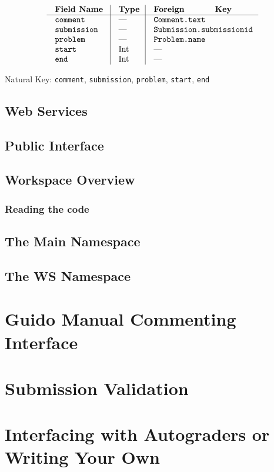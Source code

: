 $$\vbox{
  \offinterlineskip
  \halign{
    \strut \quad {\tt #}  & \vrule\quad #  & \vrule\quad # \cr
    {\bf Field Name}  & {\bf Type}  & {\bf Foreign Key}\cr
    \noalign{\hrule}    
    comment  & ---  & {\tt Comment.text} \cr
    submission & --- & {\tt Submission.submissionid} \cr
    problem  & ---  & {\tt Problem.name} \cr
    start  & Int  & --- \cr
    end  & Int  & --- \cr
  }
}$$

{\noindent
Natural Key: {\tt comment}, {\tt submission}, 
{\tt problem}, {\tt start}, {\tt end}\par}

\section{Web Services}

\section{Public Interface}

\section{Workspace Overview}

\subsection{Reading the code}

\section{The Main Namespace}

\section{The WS Namespace}

\chapter{Guido Manual Commenting Interface}

\chapter{Submission Validation}

\chapter{Interfacing with Autograders or Writing Your Own}



